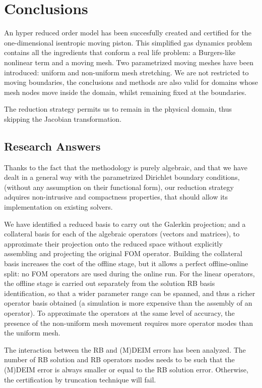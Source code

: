 \documentclass[thesis.tex]{subfiles}
\begin{document}
\section{Conclusions}
An hyper reduced order model has been succesfully created and certified for
the one-dimensional isentropic moving piston.
This simplified gas dynamics problem contains 
all the ingredients that conform a real life problem:
a Burgers-like nonlinear term and a moving mesh.
% 
Two parametrized moving meshes have been introduced: 
uniform and non-uniform mesh stretching. 
We are not restricted to moving boundaries, 
the conclusions and methods are also valid for domains 
whose mesh nodes move inside the domain, 
whilst remaining fixed at the boundaries.

The reduction strategy permits us to remain in the physical domain, 
thus skipping the Jacobian transformation.

\subsection{Research Answers}
Thanks to the fact that the methodology is purely algebraic, 
and that we have dealt in a general way 
with the parametrized Dirichlet boundary conditions,
(without any assumption on their functional form),
our reduction strategy adquires non-intrusive and compactness properties,
that should allow its implementation on existing solvers.

We have identified a reduced basis to carry out the Galerkin projection;
and a collateral basis for each of the algebraic operators (vectors and matrices),
to approximate their projection onto the reduced space 
without explicitly assembling and projecting the original FOM operator.
Building the collateral basis increases the cost of the offline stage,
but it allows a perfect offline-online split:
no FOM operators are used during the online run. 
For the linear operators,
the offline stage is carried out separately 
from the solution RB basis identification,
so that a wider parameter range can be spanned,
and thus a richer operator basis obtained
(a simulation is more expensive than the assembly of an operator).
To approximate the operators at the same level of accuracy, 
the presence of the non-uniform mesh movement 
requires more operator modes than the uniform mesh.

The interaction between the RB and (M)DEIM errors has been analyzed.
The number of RB solution and RB operators modes needs to be such that
the (M)DEIM error is always smaller or equal to the RB solution error.
Otherwise, the certification by truncation technique will fail.
\end{document}
